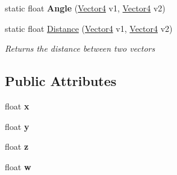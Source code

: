 \begin{DoxyCompactItemize}
\item 
\hypertarget{struct_engine_1_1_vector4_a1c090e60ec7b1e9e72f3c96bb02b2d01}{static float {\bfseries Angle} (\hyperlink{struct_engine_1_1_vector4}{Vector4} v1, \hyperlink{struct_engine_1_1_vector4}{Vector4} v2)}\label{struct_engine_1_1_vector4_a1c090e60ec7b1e9e72f3c96bb02b2d01}

\item 
static float \hyperlink{struct_engine_1_1_vector4_ae95d4b0b1aaad03e8574281af4d08bfd}{Distance} (\hyperlink{struct_engine_1_1_vector4}{Vector4} v1, \hyperlink{struct_engine_1_1_vector4}{Vector4} v2)
\begin{DoxyCompactList}\small\item\em Returns the distance between two vectors \end{DoxyCompactList}\end{DoxyCompactItemize}
\subsection*{Public Attributes}
\begin{DoxyCompactItemize}
\item 
\hypertarget{struct_engine_1_1_vector4_a3f14767c08914d86674212480de5045f}{float {\bfseries x}}\label{struct_engine_1_1_vector4_a3f14767c08914d86674212480de5045f}

\item 
\hypertarget{struct_engine_1_1_vector4_ac0cff299fc547f70fe9490d60edcdaad}{float {\bfseries y}}\label{struct_engine_1_1_vector4_ac0cff299fc547f70fe9490d60edcdaad}

\item 
\hypertarget{struct_engine_1_1_vector4_af2ee8c522cad78e713fd36e1f3300912}{float {\bfseries z}}\label{struct_engine_1_1_vector4_af2ee8c522cad78e713fd36e1f3300912}

\item 
\hypertarget{struct_engine_1_1_vector4_a8e6ce00b07bc40dcd9b6defa5d63aa64}{float {\bfseries w}}\label{struct_engine_1_1_vector4_a8e6ce00b07bc40dcd9b6defa5d63aa64}

\end{DoxyCompactItemize}
